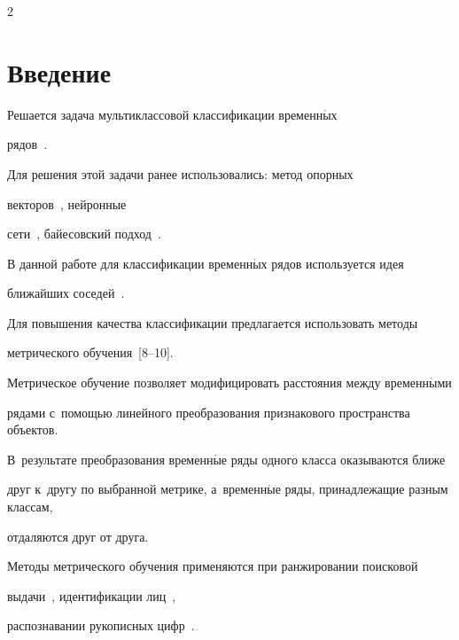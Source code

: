 \begin{multicols}{2}





\label{st\stat}





\section{Введение}





Решается задача мультиклассовой классификации временн$\acute{\mbox{ы}}$х 


рядов~\cite{popova2015multiclass, ignatov2015multiclass}.


Для решения этой задачи ранее использовались: метод опорных 


векторов~\cite{guler2007mccsvm, ubeyli2007mccsvm2}, нейронные 


сети~\cite{anand1995mccnn}, байесовский подход~\cite{kafai2012mccbn}.


В данной работе для классификации временн$\acute{\mbox{ы}}$х рядов используется идея 


ближайших соседей~\cite{chaovalitwongse2007knn}.





Для повышения качества классификации предлагается использовать методы 


метрического обучения~[8--10].




Метрическое обучение позволяет модифицировать расстояния между временн$\acute{\mbox{ы}}$ми 


рядами с~помощью линейного преобразования признакового пространства объектов.


В~результате преобразования временн$\acute{\mbox{ы}}$е ряды одного класса оказываются ближе 


друг к~другу по выбранной метрике, а~временн$\acute{\mbox{ы}}$е ряды, принадлежащие разным классам, 


отдаляются друг от друга.


Методы метрического обучения применяются при ранжировании поисковой 


выдачи~\cite{mcfee2010mlranking}, идентификации лиц~\cite{guillaumin2009mlface}, 


распознавании рукописных цифр~\cite{weinberger2008mldigits}.



\end{multicols}
